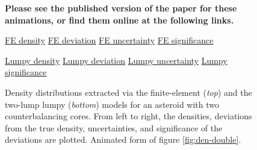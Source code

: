 \begin{figure}
  \textbf{Please see the published version of the paper for these animations, or find them online at the following links.}

  \href{https://github.com/jack-dinsmore/asteroid-tidal-torque/tree/main/paper/gifs/double-fe-d.gif}{FE density} \hfill
  \href{https://github.com/jack-dinsmore/asteroid-tidal-torque/tree/main/paper/gifs/double-fe-s.gif}{FE deviation} \hfill
  \href{https://github.com/jack-dinsmore/asteroid-tidal-torque/tree/main/paper/gifs/double-fe-u.gif}{FE uncertainty} \hfill
  \href{https://github.com/jack-dinsmore/asteroid-tidal-torque/tree/main/paper/gifs/double-fe-r.gif}{FE significance}

  \href{https://github.com/jack-dinsmore/asteroid-tidal-torque/tree/main/paper/gifs/double-l-d.gif}{Lumpy density} \hfill
  \href{https://github.com/jack-dinsmore/asteroid-tidal-torque/tree/main/paper/gifs/double-l-s.gif}{Lumpy deviation} \hfill
  \href{https://github.com/jack-dinsmore/asteroid-tidal-torque/tree/main/paper/gifs/double-l-u.gif}{Lumpy uncertainty} \hfill
  \href{https://github.com/jack-dinsmore/asteroid-tidal-torque/tree/main/paper/gifs/double-l-r.gif}{Lumpy significance}

  \caption{Density distributions extracted via the finite-element (\textit{top}) and the two-lump lumpy (\textit{bottom}) models for an asteroid with two counterbalancing cores. From left to right, the densities, deviations from the true density, uncertainties, and significance of the deviations are plotted. Animated form of figure \ref{fig:den-double}.}
  \label{fig:animated-double}
\end{figure}